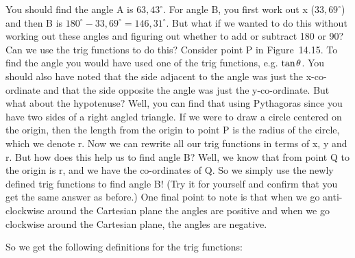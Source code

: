     \addtocounter{footnote}{-0}
    \par \label{m39411*eip-9}You should find the angle A is \begin{math}63,{43}^{\circ }\end{math}. For angle B, you first work out x (\begin{math}33,{69}^{\circ }\end{math}) and then B is \begin{math}{180}^{\circ }-33,{69}^{\circ }=146,{31}^{\circ }\end{math}. But what if we wanted to do this without working out these angles and figuring out whether to add or subtract 180 or 90? Can we use the trig functions to do this? Consider point P in Figure~14.15. To find the angle you would have used one of the trig functions, e.g. \begin{math}\mathrm{tan}\phantom{\rule{1pt}{0ex}}\theta \end{math}. You should also have noted that the side adjacent to the angle was just the x-co-ordinate and that the side opposite the angle was just the y-co-ordinate. But what about the hypotenuse? Well, you can find that using Pythagoras since you have two sides of a right angled triangle. If we were to draw a circle centered on the origin, then the length from the origin to point P is the radius of the circle, which we denote r. Now we can rewrite all our trig functions in terms of x, y and r. But how does this help us to find angle B? Well, we know that from point Q to the origin is r, and we have the co-ordinates of Q. So we simply use the newly defined trig functions to find angle B! (Try it for yourself and confirm that you get the same answer as before.) One final point to note is that when we go anti-clockwise around the Cartesian plane the angles are positive and when we go clockwise around the Cartesian plane, the angles are negative. \par \label{m39411*eip-634}So we get the following definitions for the trig functions:
\par \label{m39411*eip-169}\nopagebreak\noindent{}
